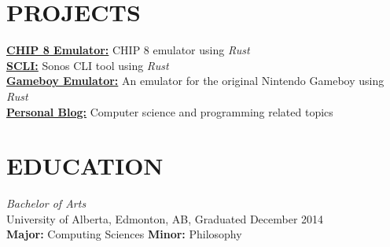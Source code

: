\documentclass[margin, 9pt]{res} %
\begin{document}
\begin{resume}


\section{PROJECTS}
\href{https://github.com/adamrmelnyk/chip_8_emulator}{\bf CHIP 8 Emulator:} CHIP 8 emulator using {\it Rust} \\
\href{https://github.com/adamrmelnyk/scli}{\bf SCLI:} Sonos CLI tool using {\it Rust} \\
\href{https://github.com/adamrmelnyk/oxide\_boy}{\bf Gameboy Emulator:} An emulator for the original Nintendo Gameboy using {\it Rust} \\
\href{https://arm64.ca}{\bf Personal Blog:} Computer science and programming related topics \\



\section{EDUCATION}

{\sl Bachelor of Arts}\\
University of Alberta, Edmonton, AB, Graduated December 2014 \\
{\bf Major:} Computing Sciences {\bf Minor:} Philosophy \\

\end{resume}
\end{document}
